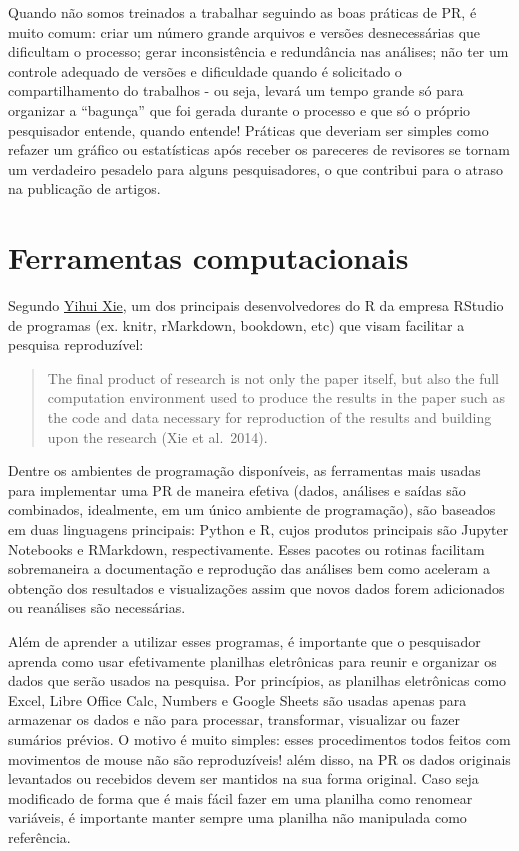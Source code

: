 \documentclass[]{book}
\begin{document}
Quando não somos treinados a trabalhar seguindo as boas práticas de PR,
é muito comum: criar um número grande arquivos e versões desnecessárias
que dificultam o processo; gerar inconsistência e redundância nas
análises; não ter um controle adequado de versões e dificuldade quando é
solicitado o compartilhamento do trabalhos - ou seja, levará um tempo
grande só para organizar a ``bagunça'' que foi gerada durante o processo
e que só o próprio pesquisador entende, quando entende! Práticas que
deveriam ser simples como refazer um gráfico ou estatísticas após
receber os pareceres de revisores se tornam um verdadeiro pesadelo para
alguns pesquisadores, o que contribui para o atraso na publicação de
artigos.

\hypertarget{ferramentas-computacionais}{%
\section{Ferramentas computacionais}\label{ferramentas-computacionais}}

Segundo \href{https://yihui.name}{Yihui Xie}, um dos principais
desenvolvedores do R da empresa RStudio de programas (ex. knitr,
rMarkdown, bookdown, etc) que visam facilitar a pesquisa reproduzível:

\begin{quote}
The final product of research is not only the paper itself, but also the
full computation environment used to produce the results in the paper
such as the code and data necessary for reproduction of the results and
building upon the research (Xie et al.~2014).
\end{quote}

Dentre os ambientes de programação disponíveis, as ferramentas mais
usadas para implementar uma PR de maneira efetiva (dados, análises e
saídas são combinados, idealmente, em um único ambiente de programação),
são baseados em duas linguagens principais: Python e R, cujos produtos
principais são Jupyter Notebooks e RMarkdown, respectivamente. Esses
pacotes ou rotinas facilitam sobremaneira a documentação e reprodução
das análises bem como aceleram a obtenção dos resultados e visualizações
assim que novos dados forem adicionados ou reanálises são necessárias.

Além de aprender a utilizar esses programas, é importante que o
pesquisador aprenda como usar efetivamente planilhas eletrônicas para
reunir e organizar os dados que serão usados na pesquisa. Por
princípios, as planilhas eletrônicas como Excel, Libre Office Calc,
Numbers e Google Sheets são usadas apenas para armazenar os dados e não
para processar, transformar, visualizar ou fazer sumários prévios. O
motivo é muito simples: esses procedimentos todos feitos com movimentos
de mouse não são reproduzíveis! além disso, na PR os dados originais
levantados ou recebidos devem ser mantidos na sua forma original. Caso
seja modificado de forma que é mais fácil fazer em uma planilha como
renomear variáveis, é importante manter sempre uma planilha não
manipulada como referência.
\end{document}
